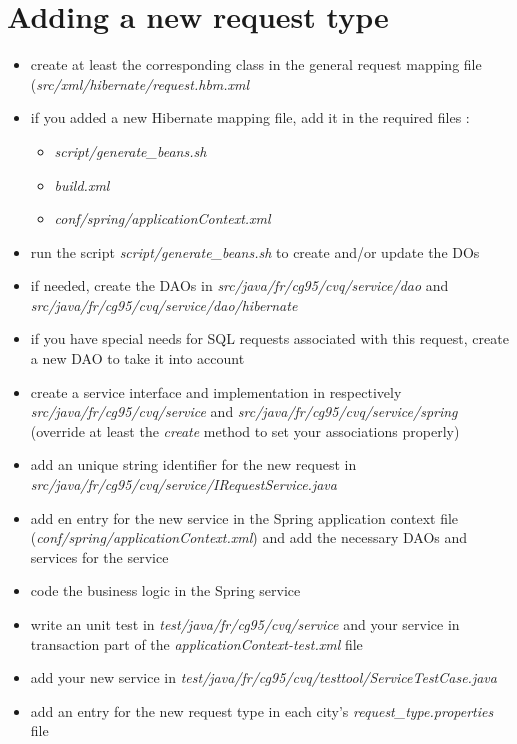 \documentclass[11pt,a4paper]{report}
\begin{document}
\section{Adding a new request type}
\begin{itemize}
  \item create at least the corresponding class in the general request mapping file
  (\emph{src/xml/hibernate/request.hbm.xml} 
  \item if you added a new Hibernate mapping file, add it in the required files :
    \begin{itemize}
      \item \emph{script/generate\_beans.sh}
      \item \emph{build.xml}
      \item \emph{conf/spring/applicationContext.xml}
    \end{itemize}
  \item run the script \emph{script/generate\_beans.sh} to create and/or update
  the DOs
  \item if needed, create the DAOs in \emph{src/java/fr/cg95/cvq/service/dao}
  and \emph{src/java/fr/cg95/cvq/service/dao/hibernate}
  \item if you have special needs for SQL requests associated with this request,
  create a new DAO to take it into account
  \item create a service interface and implementation in respectively
  \emph{src/java/fr/cg95/cvq/service} and
  \emph{src/java/fr/cg95/cvq/service/spring} (override at least the
  \emph{create} method to set your associations properly)
  \item add an unique string identifier for the new request in
  \emph{src/java/fr/cg95/cvq/service/IRequestService.java} 
  \item add en entry for the new service in the Spring application context file
  (\emph{conf/spring/applicationContext.xml}) and add the necessary DAOs and
  services for the service
  \item code the business logic in the Spring service
  \item write an unit test in \emph{test/java/fr/cg95/cvq/service} and your
  service in transaction part of the \emph{applicationContext-test.xml} file
  \item add your new service in
  \emph{test/java/fr/cg95/cvq/testtool/ServiceTestCase.java} 
  \item add an entry for the new request type in each city's
  \emph{request_type.properties} file
\end{itemize}
\end{document}
